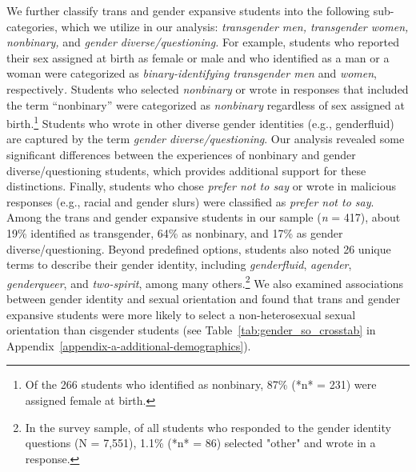 We further classify trans and gender expansive students into the
following sub-categories, which we utilize in our analysis: \emph{transgender
men, transgender women, nonbinary,} and \emph{gender diverse/questioning.}
For example, students who reported their sex assigned at birth as female
or male and who identified as a man or a woman were categorized as
\emph{binary-identifying transgender men} and \emph{women}, respectively\emph{.}
Students who selected \emph{nonbinary} or wrote in responses that included
the term ``nonbinary'' were categorized as \emph{nonbinary} regardless of sex
assigned at birth.\footnote{Of the 266 students who identified as nonbinary, 87\% (*n* = 231) were assigned female at birth.} Students who wrote in other diverse gender
identities (e.g., genderfluid) are captured by the term \emph{gender
diverse/questioning}. Our analysis revealed some significant differences
between the experiences of nonbinary and gender diverse/questioning
students, which provides additional support for these distinctions.
Finally, students who chose \emph{prefer not to say} or wrote in malicious
responses (e.g., racial and gender slurs) were classified as \emph{prefer not
to say}. Among the trans and gender expansive students in our sample
(\emph{n} = 417), about 19\% identified as transgender, 64\% as nonbinary, and
17\% as gender diverse/questioning. Beyond predefined options, students
also noted 26 unique terms to describe their gender identity, including
\emph{genderfluid}, \emph{agender}, \emph{genderqueer}, and \emph{two-spirit}, among many
others.\footnote{In the survey sample, of all students who responded to the gender identity questions (N = 7,551), 1.1\% (*n* = 86) selected "other" and wrote in a response.} We also examined associations between gender identity and
sexual orientation and found that trans and gender expansive students
were more likely to select a non-heterosexual sexual orientation than
cisgender students (see Table~\ref{tab:gender_so_crosstab} in Appendix~\ref{appendix-a-additional-demographics}).

